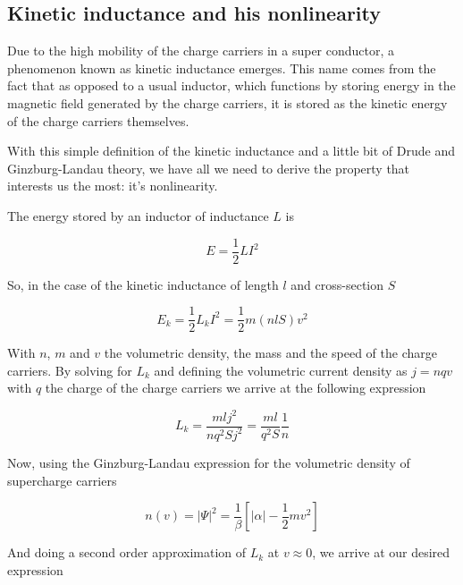 \documentclass[../main.tex]{subfiles}
\begin{document}
\newpage
\subsection{Kinetic inductance and his nonlinearity}
\label{subsec:KineticInductance}
Due to the high mobility of the charge carriers in a super conductor, a phenomenon
known as kinetic inductance emerges. This name comes from the fact that as opposed
to a usual inductor, which functions by storing energy in the magnetic field
generated by the charge carriers, it is stored as the kinetic energy of the
charge carriers themselves.

With this simple definition of the kinetic inductance and a little bit of
Drude and Ginzburg-Landau theory, we have all we need to derive the property
that interests us the most: it's nonlinearity.

The energy stored by an inductor of inductance \(L\) is

\begin{equation*}
\label{eq:InductiveEnergy}
    E = \frac{1}{2}LI^2
\end{equation*}

So, in the case of the kinetic inductance of length \(l\) and cross-section \(S\)

\begin{equation*}
\label{eq:KineticInductiveEnergy}
    E_{k} = \frac{1}{2}L_{k}I^2 = \frac{1}{2}m(nlS)v^2
\end{equation*}

With \(n\), \(m\) and \(v\) the volumetric density, the mass and the speed of
the charge carriers. By solving for \(L_{k}\) and defining the volumetric
current density as \(j=nqv\) with \(q\) the charge of the charge carriers
we arrive at the following expression

\begin{equation*}
\label{eq:LkOfn}
    L_{k} = \frac{mlj^2}{nq^2Sj^2} = \frac{ml}{q^2S}\frac{1}{n}
\end{equation*}

Now, using the Ginzburg-Landau expression for the volumetric density of supercharge
carriers

\begin{equation*}
\label{eq:GLn}
    n(v) = |\Psi|^2 = \frac{1}{\beta}\left[|\alpha| - \frac{1}{2}m v^2\right]
\end{equation*}

And doing a second order approximation of \(L_{k}\) at \(v \approx 0\), we arrive
at our desired expression
\end{document}
